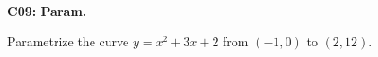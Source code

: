 \documentclass[12pt]{article}
\newcommand{\<}{\left\langle}
\renewcommand{\>}{\right\rangle}
\newcommand{\exerciseHeader}[4]{


  \vspace{0.5em}
  \textbf{#2}
  \vspace{0.5em}

}
\begin{document}
\begin{multicols}{2}
%

%

%

%

\exerciseHeader{2017 June 30}{C09: Param.}{
Parametrize planar curves and sketch parametrized curves.
}{3/4}

Parametrize the curve \(y=x^2+3x+2\) from \((-1,0)\) to \((2,12)\).



%

%

%


\end{multicols}
\end{document}
